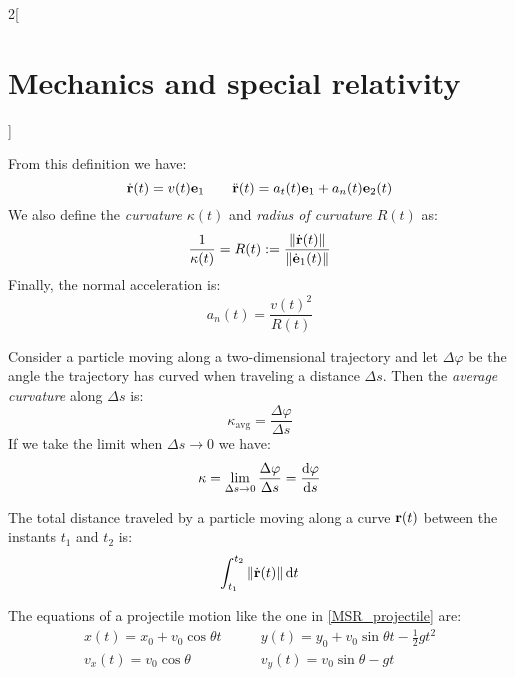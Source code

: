 \documentclass[../../../main.tex]{subfiles}
\begin{document}
\begin{multicols}{2}[\section{Mechanics and special relativity}]
\begin{definition}
    From this definition we have: $$\dot{\boldsymbol{\mathrm{r}}}(t)=v(t)\boldsymbol{\mathrm{e}}_1\qquad\ddot{\boldsymbol{\mathrm{r}}}(t)=a_t(t)\boldsymbol{\mathrm{e}}_1+a_n(t)\boldsymbol{\mathrm{e}}_2(t)$$ We also define the \emph{curvature} $\kappa(t)$ and \emph{radius of curvature} $R(t)$ as: $$\frac{1}{\kappa(t)}=R(t):=\frac{\|\dot{\boldsymbol{\mathrm{r}}}(t)\|}{\|\dot{\boldsymbol{\mathrm{e}}}_1(t)\|}$$ Finally, the normal acceleration is: $$a_n(t)=\frac{v(t)^2}{R(t)}$$
  \end{definition}
  \begin{proposition}[Curvature]
    Consider a particle moving along a two-dimensional trajectory and let $\Delta\varphi$ be the angle the trajectory has curved when traveling a distance $\Delta s$. Then the \emph{average curvature} along $\Delta s$ is: $$\kappa_\text{avg}=\frac{\Delta \varphi}{\Delta s}$$ If we take the limit when $\Delta s\to 0$ we have: $$\kappa=\lim_{\Delta s\to 0}\frac{\Delta \varphi}{\Delta s}=\dv{\varphi}{s}$$
  \end{proposition}
  \begin{proposition}
    The total distance traveled by a particle moving along a curve $\boldsymbol{\mathrm{r}}(t)$ between the instants $t_1$ and $t_2$ is: $$\int_{t_1}^{t_2}\|\dot{\boldsymbol{\mathrm{r}}}(t)\|\dd{t}$$
  \end{proposition}
  \begin{proposition}
    The equations of a projectile motion like the one in \cref{MSR_projectile} are:
    \begin{align*}
      x(t)=x_0+v_0\cos\theta t\quad & \quad y(t)=y_0+v_0\sin\theta t-\frac{1}{2}gt^2 \\
      v_x(t)=v_0\cos\theta\quad     & \quad v_y(t)=v_0\sin\theta-gt
    \end{align*}
    \begin{center}
      \begin{minipage}{\linewidth}
        \centering
        
        \label{MSR_projectile}
      \end{minipage}
    \end{center}
  \end{proposition}

\end{multicols}
\end{document}
